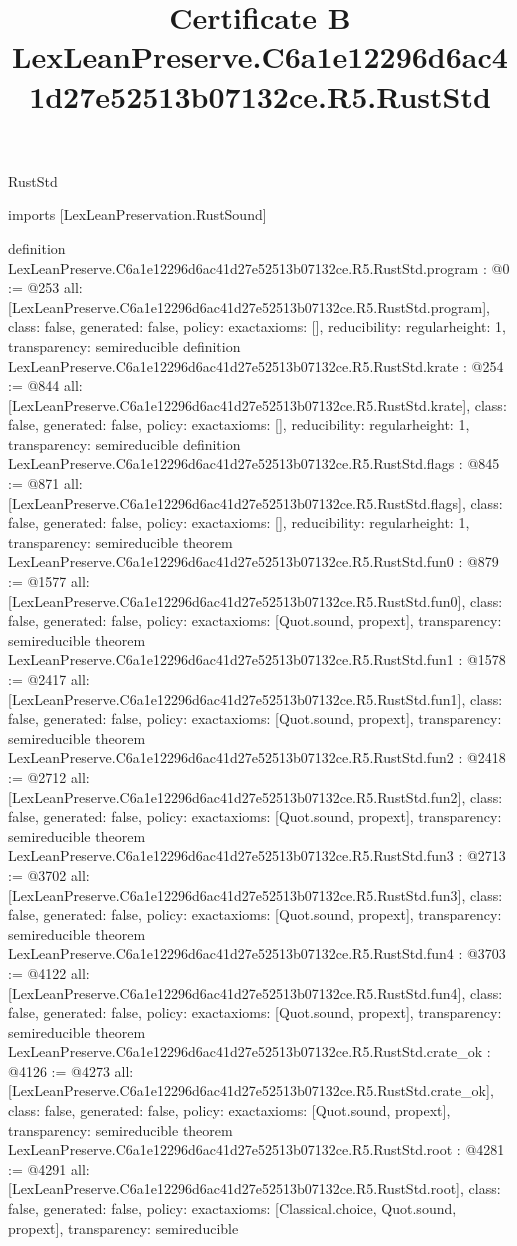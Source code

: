 \begin{lexlean}{RustStd}
\title{Certificate B LexLeanPreserve.C6a1e12296d6ac41d27e52513b07132ce.R5.RustStd}
\begin{coremodule}
imports [LexLeanPreservation.RustSound]

definition LexLeanPreserve.C6a1e12296d6ac41d27e52513b07132ce.R5.RustStd.program : @0 := @253 {
  all: [LexLeanPreserve.C6a1e12296d6ac41d27e52513b07132ce.R5.RustStd.program],
  class: false,
  generated: false,
  policy: exact{axioms: []},
  reducibility: regular{height: 1},
  transparency: semireducible
}
definition LexLeanPreserve.C6a1e12296d6ac41d27e52513b07132ce.R5.RustStd.krate : @254 := @844 {
  all: [LexLeanPreserve.C6a1e12296d6ac41d27e52513b07132ce.R5.RustStd.krate],
  class: false,
  generated: false,
  policy: exact{axioms: []},
  reducibility: regular{height: 1},
  transparency: semireducible
}
definition LexLeanPreserve.C6a1e12296d6ac41d27e52513b07132ce.R5.RustStd.flags : @845 := @871 {
  all: [LexLeanPreserve.C6a1e12296d6ac41d27e52513b07132ce.R5.RustStd.flags],
  class: false,
  generated: false,
  policy: exact{axioms: []},
  reducibility: regular{height: 1},
  transparency: semireducible
}
theorem LexLeanPreserve.C6a1e12296d6ac41d27e52513b07132ce.R5.RustStd.fun0 : @879 := @1577 {
  all: [LexLeanPreserve.C6a1e12296d6ac41d27e52513b07132ce.R5.RustStd.fun0],
  class: false,
  generated: false,
  policy: exact{axioms: [Quot.sound, propext]},
  transparency: semireducible
}
theorem LexLeanPreserve.C6a1e12296d6ac41d27e52513b07132ce.R5.RustStd.fun1 : @1578 := @2417 {
  all: [LexLeanPreserve.C6a1e12296d6ac41d27e52513b07132ce.R5.RustStd.fun1],
  class: false,
  generated: false,
  policy: exact{axioms: [Quot.sound, propext]},
  transparency: semireducible
}
theorem LexLeanPreserve.C6a1e12296d6ac41d27e52513b07132ce.R5.RustStd.fun2 : @2418 := @2712 {
  all: [LexLeanPreserve.C6a1e12296d6ac41d27e52513b07132ce.R5.RustStd.fun2],
  class: false,
  generated: false,
  policy: exact{axioms: [Quot.sound, propext]},
  transparency: semireducible
}
theorem LexLeanPreserve.C6a1e12296d6ac41d27e52513b07132ce.R5.RustStd.fun3 : @2713 := @3702 {
  all: [LexLeanPreserve.C6a1e12296d6ac41d27e52513b07132ce.R5.RustStd.fun3],
  class: false,
  generated: false,
  policy: exact{axioms: [Quot.sound, propext]},
  transparency: semireducible
}
theorem LexLeanPreserve.C6a1e12296d6ac41d27e52513b07132ce.R5.RustStd.fun4 : @3703 := @4122 {
  all: [LexLeanPreserve.C6a1e12296d6ac41d27e52513b07132ce.R5.RustStd.fun4],
  class: false,
  generated: false,
  policy: exact{axioms: [Quot.sound, propext]},
  transparency: semireducible
}
theorem LexLeanPreserve.C6a1e12296d6ac41d27e52513b07132ce.R5.RustStd.crate_ok : @4126 := @4273 {
  all: [LexLeanPreserve.C6a1e12296d6ac41d27e52513b07132ce.R5.RustStd.crate_ok],
  class: false,
  generated: false,
  policy: exact{axioms: [Quot.sound, propext]},
  transparency: semireducible
}
theorem LexLeanPreserve.C6a1e12296d6ac41d27e52513b07132ce.R5.RustStd.root : @4281 := @4291 {
  all: [LexLeanPreserve.C6a1e12296d6ac41d27e52513b07132ce.R5.RustStd.root],
  class: false,
  generated: false,
  policy: exact{axioms: [Classical.choice, Quot.sound, propext]},
  transparency: semireducible
}


\end{coremodule}
\end{lexlean}

